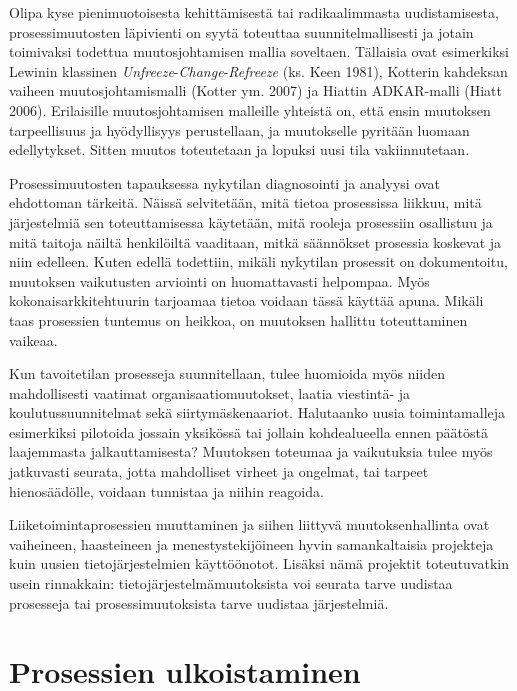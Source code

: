 \documentclass[
  finnish,
  letterpaper,
  DIV=11,
  numbers=noendperiod,
  oneside]{scrreprt}
\begin{document}
Olipa kyse pienimuotoisesta kehittämisestä tai radikaalimmasta
uudistamisesta, prosessimuutosten läpivienti on syytä toteuttaa
suunnitelmallisesti ja jotain toimivaksi todettua muutosjohtamisen
mallia soveltaen. Tällaisia ovat esimerkiksi Lewinin klassinen
\emph{Unfreeze}-\emph{Change}-\emph{Refreeze} (ks. Keen 1981), Kotterin
kahdeksan vaiheen muutosjohtamismalli ({Kotter ym.} 2007) ja Hiattin
ADKAR-malli (Hiatt 2006). Erilaisille muutosjohtamisen malleille
yhteistä on, että ensin muutoksen tarpeellisuus ja hyödyllisyys
perustellaan, ja muutokselle pyritään luomaan edellytykset. Sitten
muutos toteutetaan ja lopuksi uusi tila vakiinnutetaan.

Prosessimuutosten tapauksessa nykytilan diagnosointi ja analyysi ovat
ehdottoman tärkeitä. Näissä selvitetään, mitä tietoa prosessissa
liikkuu, mitä järjestelmiä sen toteuttamisessa käytetään, mitä rooleja
prosessiin osallistuu ja mitä taitoja näiltä henkilöiltä vaaditaan,
mitkä säännökset prosessia koskevat ja niin edelleen. Kuten edellä
todettiin, mikäli nykytilan prosessit on dokumentoitu, muutoksen
vaikutusten arviointi on huomattavasti helpompaa. Myös
kokonaisarkkitehtuurin tarjoamaa tietoa voidaan tässä käyttää apuna.
Mikäli taas prosessien tuntemus on heikkoa, on muutoksen hallittu
toteuttaminen vaikeaa.

Kun tavoitetilan prosesseja suunnitellaan, tulee huomioida myös niiden
mahdollisesti vaatimat organisaatiomuutokset, laatia viestintä- ja
koulutussuunnitelmat sekä siirtymäskenaariot. Halutaanko uusia
toimintamalleja esimerkiksi pilotoida jossain yksikössä tai jollain
kohdealueella ennen päätöstä laajemmasta jalkauttamisesta? Muutoksen
toteumaa ja vaikutuksia tulee myös jatkuvasti seurata, jotta mahdolliset
virheet ja ongelmat, tai tarpeet hienosäädölle, voidaan tunnistaa ja
niihin reagoida.

Liiketoimintaprosessien muuttaminen ja siihen liittyvä muutoksenhallinta
ovat vaiheineen, haasteineen ja menestystekijöineen hyvin samankaltaisia
projekteja kuin uusien tietojärjestelmien käyttöönotot. Lisäksi nämä
projektit toteutuvatkin usein rinnakkain: tietojärjestelmämuutoksista
voi seurata tarve uudistaa prosesseja tai prosessimuutoksista tarve
uudistaa järjestelmiä.

\section{Prosessien ulkoistaminen}\label{prosessien-ulkoistaminen}
\end{document}
